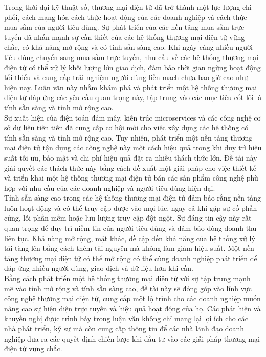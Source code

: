 \noindent Trong thời đại kỹ thuật số, thương mại điện tử đã trở thành một lực lượng chi phối, cách mạng hóa cách thức hoạt động của các doanh nghiệp và cách thức mua sắm của người tiêu dùng. 
Sự phát triển của các nền tảng mua sắm trực tuyến đã nhấn mạnh sự cần thiết của các hệ thống thương mại điện tử vững chắc, có khả năng mở rộng và có tính sẵn sàng cao. 
Khi ngày càng nhiều người tiêu dùng chuyển sang mua sắm trực tuyến, nhu cầu về các hệ thống thương mại điện tử có thể xử lý khối lượng lớn giao dịch, đảm bảo thời gian ngừng hoạt động tối thiểu và cung cấp trải nghiệm người dùng liền mạch chưa bao giờ cao như hiện nay. Luận văn này nhằm khám phá và phát triển một hệ thống thương mại điện tử đáp ứng các yêu cầu quan trọng này, tập trung vào  các mục tiêu cốt lõi là tính sẵn sàng và tính mở rộng cao.\\[0.5cm]
Sự xuất hiện của điện toán đám mây, kiến trúc microservices và các công nghệ cơ sở dữ liệu tiên tiến đã cung cấp cơ hội mới cho việc xây dựng các hệ thống có tính sẵn sàng và tính mở rộng cao. 
Tuy nhiên, phát triển một nền tảng thương mại điện tử tận dụng các công nghệ này một cách hiệu quả trong khi duy trì hiệu suất tối ưu, bảo mật và chi phí hiệu quả đặt ra nhiều thách thức lớn. Đề tài này giải quyết các thách thức này bằng cách đề xuất một giải pháp cho việc thiết kế và triển khai một hệ thống thương mại điện tử bán các sản phẩm công nghệ phù hợp với nhu cầu của các doanh nghiệp và người tiêu dùng hiện đại.\\[0.5cm]
Tính sẵn sàng cao trong các hệ thống thương mại điện tử đảm bảo rằng nền tảng luôn hoạt động và có thể truy cập được vào mọi lúc, ngay cả khi gặp sự cố phần cứng, lỗi phần mềm hoặc lưu lượng truy cập đột ngột. Sự đáng tin cậy này rất quan trọng để duy trì niềm tin của người tiêu dùng và đảm bảo dòng doanh thu liên tục. 
Khả năng mở rộng, mặt khác, đề cập đến khả năng của hệ thống xử lý tải tăng lên bằng cách thêm tài nguyên mà không làm giảm hiệu suất. Một nền tảng thương mại điện tử có thể mở rộng có thể cùng doanh nghiệp phát triển để đáp ứng nhiều người dùng, giao dịch và dữ liệu hơn khi cần.\\[0.5cm]
Bằng cách phát triển một hệ thống thương mại điện tử với sự tập trung mạnh mẽ vào tính mở rộng và tính sẵn sàng cao, đề tài này sẽ đóng góp vào lĩnh vực công nghệ thương mại điện tử, cung cấp một lộ trình cho các doanh nghiệp muốn nâng cao sự hiện diện trực tuyến và hiệu quả hoạt động của họ. 
Các phát hiện và khuyến nghị được trình bày trong luận văn không chỉ mang lại lợi ích cho các nhà phát triển, kỹ sư mà còn cung cấp thông tin để các nhà lãnh đạo doanh nghiệp đưa ra các quyết định chiến lược khi đầu tư vào các giải pháp thương mại điện tử vững chắc.


